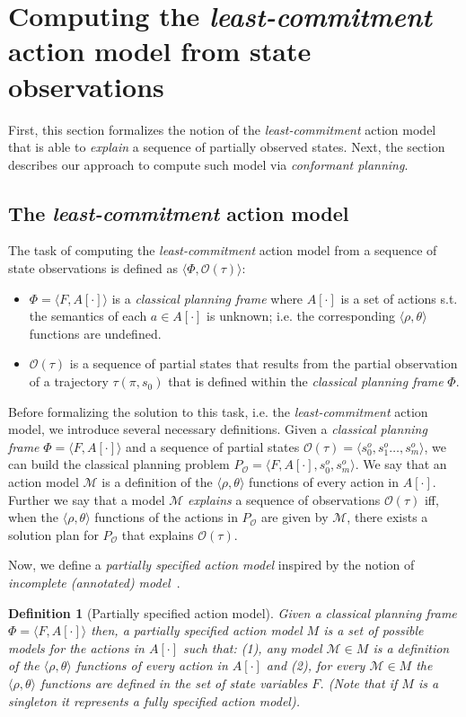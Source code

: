 \documentclass{article}
\newcommand{\tup}[1]{{\langle #1 \rangle}}
\newtheorem{definition}[theorem]{Definition}
\begin{document}
\section{Computing the {\em least-commitment} action model from state observations}
First, this section formalizes the notion of the {\em least-commitment} action model that is able to {\em explain} a sequence of partially observed states. Next, the section describes our approach to compute such model via {\em conformant planning}. 

\subsection{The {\em least-commitment} action model}
The task of computing the {\em least-commitment} action model from a sequence of state observations is defined as $\tup{\Phi,\mathcal{O}(\tau)}$:
\begin{itemize}
\item $\Phi=\tup{F,A[\cdot]}$ is a {\em classical planning frame} where $A[\cdot]$ is a set of actions s.t. the semantics of each $a\in A[\cdot]$ is unknown; i.e. the corresponding $\tup{\rho,\theta}$ functions are undefined. 
\item $\mathcal{O}(\tau)$ is a sequence of partial states that results from the partial observation of a trajectory $\tau(\pi,s_0)$ that is defined within the {\em classical planning frame} $\Phi$.
\end{itemize}

Before formalizing the solution to this task, i.e. the {\em least-commitment} action model, we introduce several necessary definitions. Given a {\em classical planning frame} $\Phi=\tup{F,A[\cdot]}$ and a sequence of partial states $\mathcal{O}(\tau)=\tup{s_0^o,s_1^o \ldots , s_m^o}$, we can build the classical planning problem $P_\mathcal{O}=\tup{F,A[\cdot],s_0^o,s_m^o}$. We say that an action model $\mathcal{M}$ is a definition of the $\tup{\rho,\theta}$ functions of every action in $A[\cdot]$. Further we say that a model $\mathcal{M}$ {\em explains} a sequence of observations $\mathcal{O}(\tau)$ iff, when the $\tup{\rho,\theta}$ functions of the actions in $P_\mathcal{O}$ are given by $\mathcal{M}$, there exists a solution plan for $P_\mathcal{O}$ that explains $\mathcal{O}(\tau)$.

Now, we define a {\em partially specified action model} inspired by the notion of {\em incomplete (annotated) model}~\cite{sreedharan2018handling}.
\begin{definition}[Partially specified action model]
Given a {\em classical planning frame} $\Phi=\tup{F,A[\cdot]}$ then, a {\em partially specified action model} $M$ is a set of possible models for the actions in $A[\cdot]$ such that: (1), any model $\mathcal{M}\in M$ is a definition of the $\tup{\rho,\theta}$ functions of every action in $A[\cdot]$ and (2), for every $\mathcal{M}\in M$ the $\tup{\rho,\theta}$ functions are defined in the set of state variables $F$. (Note that if $M$ is a singleton it represents a {\em fully specified action model}).
\end{definition}
\end{document}
